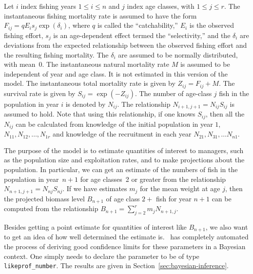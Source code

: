 \documentclass{admbmanual}
\begin{document}
Let $i$ index fishing years $1\le i\le n$ and $j$ index age classes,
with $1\le j\le r$.
The instantaneous fishing mortality rate is assumed to have the 
form $F_{ij}=qE_is_j\exp(\delta_i)$, where $q$ is called the ``catchability,''
$E_i$ is the observed fishing effort, $s_j$ is an age-dependent effect
termed the ``selectivity,'' and the $\delta_i$ are deviations from the
expected relationship between the observed fishing effort and
the resulting fishing mortality. The $\delta_i$ are assumed to
be normally distributed, with mean~0. The instantaneous
natural mortality rate $M$ is assumed to be independent of
year and age class. It is not estimated in this version of the model.
The instantaneous total
mortality rate is given by $Z_{ij}=F_{ij}+M$. The survival rate is given
by $S_{ij}=\exp(-Z_{ij})$. The number of age-class $j$ fish
in the population in year $i$ is denoted by $N_{ij}$.
The relationship $N_{i+1,j+1}=N_{ij}S_{ij}$ is assumed to hold.
Note that using this relationship, if one knows $S_{ij}$, then all
the $N_{ij}$ can be calculated from knowledge of the 
initial population in year $1$, $N_{11}, N_{12},\ldots, N_{1r}$
and knowledge of the recruitment in each year $N_{21}, N_{31},\ldots N_{n1}$.

The purpose of the model is to estimate quantities of interest to
managers, such as the population size and exploitation rates,
and to make projections about the population. In particular, we can get 
an estimate of the numbers of fish in the population in year~$n+1$
for age classes~2 or greater from the relationship
$N_{n+1,j+1}=N_{nj}S_{nj}$. If we have estimates $m_j$ for the mean weight
at age $j$, then the projected biomass level $B_{n+1}$ of age class $2+$
fish for year $n+1$ can be computed from the relationship
$B_{n+1}=\sum_{j=2}^r m_jN_{n+1,j}$.

Besides getting a point estimate for quantities of interest like
$B_{n+1}$, we also want to get an idea of how well determined the
estimate is. \ADM\ has completely automated the process of deriving
good confidence limits for these parameters in a Bayesian context.
One simply needs to declare the parameter to be of type
\texttt{likeprof\_number}. The results are given in Section~\ref{sec:bayesian-inference}.
\end{document}

